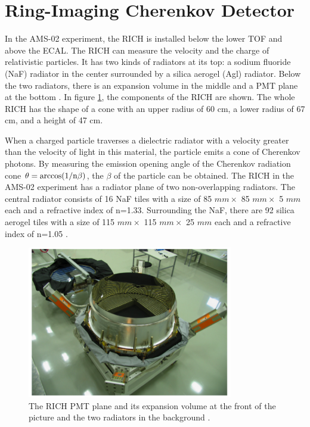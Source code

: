 
\section{Ring-Imaging Cherenkov Detector}

In the AMS-02 experiment, the RICH is installed below the lower TOF and above the ECAL. The RICH can measure the velocity and the charge of relativistic particles. It has two kinds of radiators at its top: a sodium fluoride (NaF) radiator in the center surrounded by a silica aerogel (Agl) radiator. Below the two radiators, there is an expansion volume in the middle and a PMT plane at the bottom \cite{AMSRICHPaper1, AMSRICHPaper2}. In figure \ref{RICHDetector}, the components of the RICH are shown. The whole RICH has the shape of a cone with an upper radius of 60 cm, a lower radius of 67 cm, and a height of 47 cm. \par

When a charged particle traverses a dielectric radiator with a velocity greater than the velocity of light in this material, the particle emits a cone of Cherenkov photons. By measuring the emission opening angle of the Cherenkov radiation cone $\theta = \rm{arccos} (1/n\beta)$, the $\beta$ of the particle can be obtained. The RICH in the AMS-02 experiment has a radiator plane of two non-overlapping radiators. The central radiator consists of 16 NaF tiles with a size of 85 $mm \times$ 85 $mm \times$ 5 $mm$ each and a refractive index of n=1.33. Surrounding the NaF, there are 92 silica aerogel tiles with a size of 115 $mm \times$ 115 $mm \times$ 25 $mm$ each and a refractive index of n=1.05 \cite{AMSRICHPaper1}.    \par
 
\begin{figure}[htpb]
\centering
\includegraphics[width=0.8\textwidth, height=0.4\textheight ]{Figures/chapter3/RICH/RICHDetector.png}
\caption[The RICH PMT plane, its expansion volume and two radiators.]{The RICH PMT plane and its expansion volume at the front of the picture and the two radiators in the background \cite{RICHDetector}.}
\label{RICHDetector}
\end{figure}

